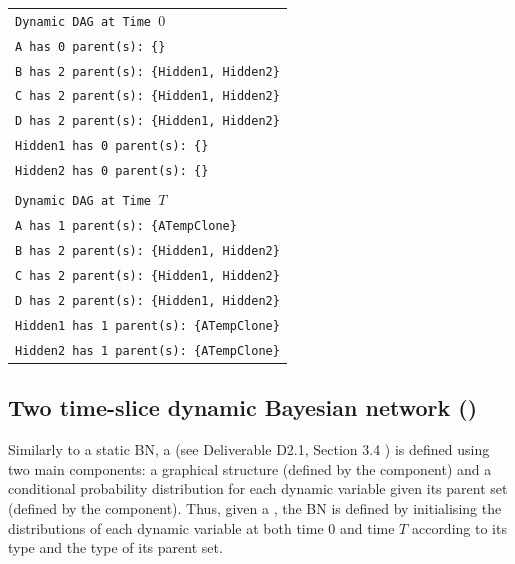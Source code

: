 \vspace{-0.1in}
\begin{table}[H]
\small{\begin{tabular}{l} \\

\texttt{Dynamic DAG at Time $0$}\\
\texttt{A has 0 parent(s): \{\}}\\
\texttt{B has 2 parent(s): \{Hidden1, Hidden2\}}\\
\texttt{C has 2 parent(s): \{Hidden1, Hidden2\}}\\
\texttt{D has 2 parent(s): \{Hidden1, Hidden2\}}\\
\texttt{Hidden1 has 0 parent(s): \{\}}\\
\texttt{Hidden2 has 0 parent(s): \{\}}\\\\

\texttt{Dynamic DAG at Time $T$}\\
\texttt{A has 1 parent(s): \{ATempClone\}}\\
\texttt{B has 2 parent(s): \{Hidden1, Hidden2\}}\\
\texttt{C has 2 parent(s): \{Hidden1, Hidden2\}}\\
\texttt{D has 2 parent(s): \{Hidden1, Hidden2\}}\\
\texttt{Hidden1 has 1 parent(s): \{ATempClone\}}\\
\texttt{Hidden2 has 1 parent(s): \{ATempClone\}}\\

\end{tabular}}
\end{table}

\subsection{Two time-slice dynamic Bayesian network ()}

Similarly to a static BN, a  (see Deliverable D2.1, Section 3.4 \cite{Deliverable2.1}) is defined using two main components: a graphical structure (defined by the  component) and a conditional probability distribution for each dynamic variable given its parent set (defined by the  component). Thus, given a , the BN is defined by initialising the distributions of each dynamic variable at both time $0$ and time $T$ according to its type and the type of its parent set. 

